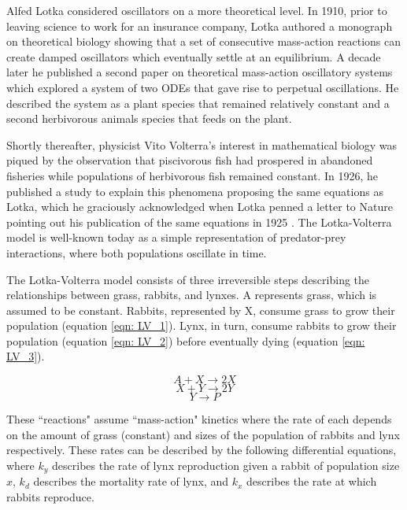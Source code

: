 \documentclass[12pt]{report}
\begin{document}
Alfed Lotka considered oscillators on a more theoretical level. In 1910, prior to leaving science to work for an insurance company, Lotka authored a monograph on theoretical biology \cite{Lotka1910} showing that a set of consecutive mass-action reactions can create damped oscillators which eventually settle at an equilibrium. A decade later he published a second paper on theoretical mass-action oscillatory systems \cite{Lotka1920, Lotka1920b} which explored a system of two ODEs that gave rise to perpetual oscillations. He described the system as a plant species that remained relatively constant and a second herbivorous animals species that feeds on the plant.

Shortly thereafter, physicist Vito Volterra's interest in mathematical biology was piqued by the observation that piscivorous fish had prospered in abandoned fisheries while populations of herbivorous fish remained constant. In 1926, he published a study to explain this phenomena proposing the same equations as Lotka, which he graciously acknowledged when Lotka penned a letter to Nature pointing out his publication of the same equations in 1925 \cite{Volterra, lotka-volterra}. The Lotka-Volterra model is well-known today as a simple representation of predator-prey interactions, where both populations oscillate in time. 

The Lotka-Volterra model consists of three irreversible steps describing the relationships between grass, rabbits, and lynxes. A represents grass, which is assumed to be constant. Rabbits, represented by X, consume grass to grow their population (equation \ref{eqn: LV_1}). Lynx, in turn, consume rabbits to grow their population (equation \ref{eqn: LV_2}) before eventually dying (equation \ref{eqn: LV_3}).

\begin{equation}
\label{eqn: LV_1}
A + X \to 2X
\end{equation}
\begin{equation}
\label{eqn: LV_2}
X + Y \to 2Y
\end{equation}
\begin{equation}
\label{eqn: LV_3}
Y \to P
\end{equation}

These ``reactions" assume ``mass-action" kinetics where the rate of each depends on the amount of grass (constant) and sizes of the population of rabbits and lynx respectively. These rates can be described by the following differential equations, where ${k_{y}}$ describes the rate of lynx reproduction given a rabbit of population size ${x}$, ${k_{d}}$ describes the mortality rate of lynx, and ${k_{x}}$ describes the rate at which rabbits reproduce. 
\end{document}
